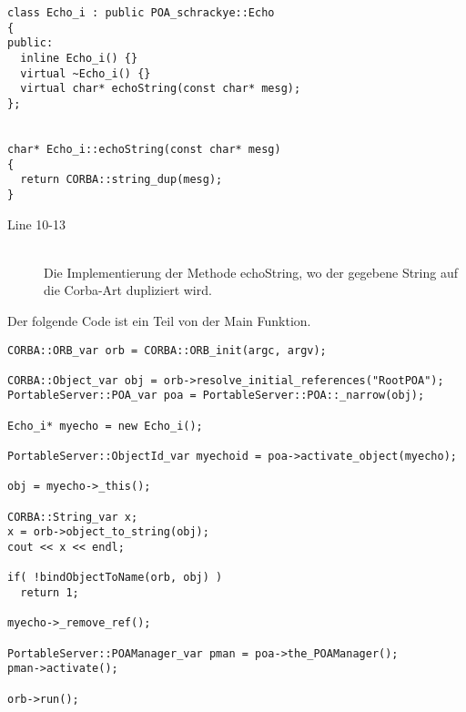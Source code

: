 \documentclass[11pt]{article}
\begin{document}
\begin{lstlisting}
class Echo_i : public POA_schrackye::Echo
{
public:
  inline Echo_i() {}
  virtual ~Echo_i() {}
  virtual char* echoString(const char* mesg);
};


char* Echo_i::echoString(const char* mesg)
{
  return CORBA::string_dup(mesg);
}
\end{lstlisting}

\begin{description}

\item[Line 10-13] \hfill \\
Die Implementierung der Methode echoString, wo der gegebene String auf die Corba-Art dupliziert wird.

\end{description}

Der folgende Code ist ein Teil von der Main Funktion.

\begin{lstlisting}
CORBA::ORB_var orb = CORBA::ORB_init(argc, argv);

CORBA::Object_var obj = orb->resolve_initial_references("RootPOA");
PortableServer::POA_var poa = PortableServer::POA::_narrow(obj);

Echo_i* myecho = new Echo_i();

PortableServer::ObjectId_var myechoid = poa->activate_object(myecho);

obj = myecho->_this();

CORBA::String_var x;
x = orb->object_to_string(obj);
cout << x << endl;

if( !bindObjectToName(orb, obj) )
  return 1;

myecho->_remove_ref();

PortableServer::POAManager_var pman = poa->the_POAManager();
pman->activate();

orb->run();
\end{lstlisting}
\end{document}
